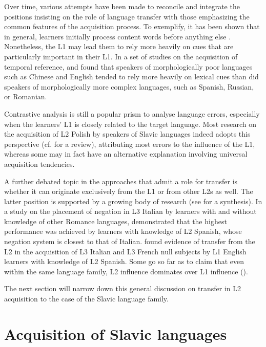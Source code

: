 \documentclass[output=paper,            colorlinks, citecolor=brown            		  ]{langscibook}
\begin{document}
Over time, various attempts have been made to reconcile and integrate the positions insisting on the role of language transfer with those emphasizing the common features of the acquisition process. To exemplify, it has been shown that in general, learners initially process content words before anything else \citep{VanPatten2004Input}. Nonetheless, the L1 may lead them to rely more heavily on cues that are particularly important in their L1. In a set of studies on the acquisition of temporal reference, \citet{EllisSagarra2010b, EllisSagarra2010a, EllisSagarra2011} and \citet{SagarraEllis2013} found that speakers of morphologically poor languages such as Chinese and English tended to rely more heavily on lexical cues than did speakers of morphologically more complex languages, such as Spanish, Russian, or Romanian. 

Contrastive analysis is still a popular prism to analyse language errors, especially when the learners’ L1 is closely related to the target language. Most research on the acquisition of L2 Polish by speakers of Slavic languages indeed adopts this perspective (cf. \citealt{Saturno2022b} for a review), attributing most errors to the influence of the L1, whereas some may in fact have an alternative explanation involving universal acquisition tendencies.

A further debated topic in the approaches that admit a role for transfer is whether it can originate exclusively from the L1 or from other L2s as well. The latter position is supported by a growing body of research (see \citealt{Bardel2019} for a synthesis). In a study on the placement of negation in L3 Italian by learners with and without knowledge of other Romance languages, \citet{Bardel2006} demonstrated that the highest performance was achieved by learners with knowledge of L2 Spanish, whose negation system is closest to that of Italian.  \citet{RothmanCabrelliAmaro2010} found evidence of transfer from the L2 in the acquisition of L3 Italian and L3 French null subjects by L1 English learners with knowledge of L2 Spanish. Some go so far as to claim that even within the same language family, L2 influence dominates over L1 influence (\citealt{Bohnacker2006,BardelFalk2007}). 

The next section will narrow down this general discussion on transfer in L2 acquisition to the case of the Slavic language family.

\section{Acquisition of Slavic languages}\label{sec:saturno:2}
\end{document}
